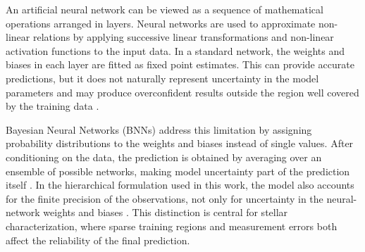 





An artificial neural network can be viewed as a sequence of mathematical operations arranged in layers. Neural networks are used to approximate non-linear relations by applying successive linear transformations and non-linear activation functions to the input data. In a standard network, the weights and biases in each layer are fitted as fixed point estimates. This can provide accurate predictions, but it does not naturally represent uncertainty in the model parameters and may produce overconfident results outside the region well covered by the training data \citep{jospin2022bnn}. 

Bayesian Neural Networks (BNNs) address this limitation by assigning probability distributions to the weights and biases instead of single values. After conditioning on the data, the prediction is obtained by averaging over an ensemble of possible networks, making model uncertainty part of the prediction itself \citep{blundell2015weight}. In the hierarchical formulation used in this work, the model also accounts for the finite precision of the observations, not only for uncertainty in the neural-network weights and biases \citep{jospin2022bnn}. This distinction is central for stellar characterization, where sparse training regions and measurement errors both affect the reliability of the final prediction.


